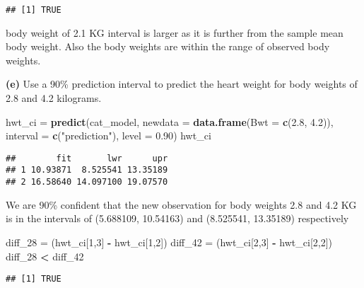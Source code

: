\documentclass[
]{article}
\newenvironment{Shaded}{\begin{snugshade}}{\end{snugshade}}
\newcommand{\DataTypeTok}[1]{\textcolor[rgb]{0.13,0.29,0.53}{#1}}
\newcommand{\DecValTok}[1]{\textcolor[rgb]{0.00,0.00,0.81}{#1}}
\newcommand{\FloatTok}[1]{\textcolor[rgb]{0.00,0.00,0.81}{#1}}
\newcommand{\KeywordTok}[1]{\textcolor[rgb]{0.13,0.29,0.53}{\textbf{#1}}}
\newcommand{\NormalTok}[1]{#1}
\newcommand{\OperatorTok}[1]{\textcolor[rgb]{0.81,0.36,0.00}{\textbf{#1}}}
\newcommand{\StringTok}[1]{\textcolor[rgb]{0.31,0.60,0.02}{#1}}
\begin{document}
\begin{verbatim}
## [1] TRUE
\end{verbatim}

body weight of 2.1 KG interval is larger as it is further from the
sample mean body weight. Also the body weights are within the range of
observed body weights.

\textbf{(e)} Use a 90\% prediction interval to predict the heart weight
for body weights of 2.8 and 4.2 kilograms.

\begin{Shaded}
\begin{Highlighting}[]
\NormalTok{hwt_ci =}\StringTok{ }\KeywordTok{predict}\NormalTok{(cat_model, }\DataTypeTok{newdata =} \KeywordTok{data.frame}\NormalTok{(}\DataTypeTok{Bwt =} \KeywordTok{c}\NormalTok{(}\FloatTok{2.8}\NormalTok{, }\FloatTok{4.2}\NormalTok{)), }\DataTypeTok{interval =} \KeywordTok{c}\NormalTok{(}\StringTok{"prediction"}\NormalTok{), }\DataTypeTok{level =} \FloatTok{0.90}\NormalTok{)}
\NormalTok{hwt_ci}
\end{Highlighting}
\end{Shaded}

\begin{verbatim}
##        fit       lwr      upr
## 1 10.93871  8.525541 13.35189
## 2 16.58640 14.097100 19.07570
\end{verbatim}

We are 90\% confident that the new observation for body weights 2.8 and
4.2 KG is in the intervals of (5.688109, 10.54163) and (8.525541,
13.35189) respectively

\begin{Shaded}
\begin{Highlighting}[]
\NormalTok{diff_}\DecValTok{28}\NormalTok{ =}\StringTok{ }\NormalTok{(hwt_ci[}\DecValTok{1}\NormalTok{,}\DecValTok{3}\NormalTok{] }\OperatorTok{-}\StringTok{ }\NormalTok{hwt_ci[}\DecValTok{1}\NormalTok{,}\DecValTok{2}\NormalTok{])}
\NormalTok{diff_}\DecValTok{42}\NormalTok{ =}\StringTok{ }\NormalTok{(hwt_ci[}\DecValTok{2}\NormalTok{,}\DecValTok{3}\NormalTok{] }\OperatorTok{-}\StringTok{ }\NormalTok{hwt_ci[}\DecValTok{2}\NormalTok{,}\DecValTok{2}\NormalTok{])}
\NormalTok{diff_}\DecValTok{28} \OperatorTok{<}\StringTok{ }\NormalTok{diff_}\DecValTok{42}
\end{Highlighting}
\end{Shaded}

\begin{verbatim}
## [1] TRUE
\end{verbatim}
\end{document}
